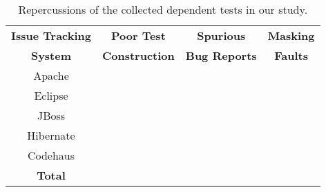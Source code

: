 \begin{table}
\centering
\setlength{\tabcolsep}{0.3\tabcolsep}
\begin{tabular}{|c||c|c|c|}
\hline
\textbf{Issue Tracking} & \textbf{Poor Test} & \textbf{Spurious} & \textbf{Masking} \\
\textbf{System } & \textbf{Construction} & \textbf{Bug Reports}
& \textbf{Faults}  \\
\hline
Apache & & & \\
\hline
Eclipse & & & \\
\hline
JBoss& & & \\
\hline
Hibernate& & & \\
\hline
Codehaus& & & \\
\hline
\hline
\textbf{Total} & & & \\
\hline
\end{tabular}
\caption{
Repercussions of the collected dependent tests in our study.
}
\label{tab:reper}
\end{table}
